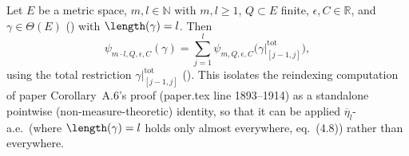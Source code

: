 \begin{helper}
  Let $E$ be a metric space, $m, l \in \mathbb{N}$ with $m,l \ge 1$, $Q \subset E$ finite,
  $\epsilon, C \in \mathbb{R}$, and $\gamma \in \Theta(E)$ () with
  $\length(\gamma) = l$. Then
  \[
    \psi_{m\cdot l,Q,\epsilon,C}(\gamma) = \sum_{j=1}^l \psi_{m,Q,\epsilon,C}\bigl(
      \gamma|^{\mathrm{tot}}_{[j-1,j]}\bigr)
    ,
  \]
  using the total restriction $\gamma|^{\mathrm{tot}}_{[j-1,j]}$ (). This
  isolates the reindexing computation of paper Corollary~A.6's proof (paper.tex line 1893--1914) as
  a standalone pointwise (non-measure-theoretic) identity, so that it can be applied
  $\overline{\eta}_l$-a.e.\ (where $\length(\gamma) = l$ holds only almost everywhere,
  eq.~(4.8)) rather than everywhere.
\end{helper}
